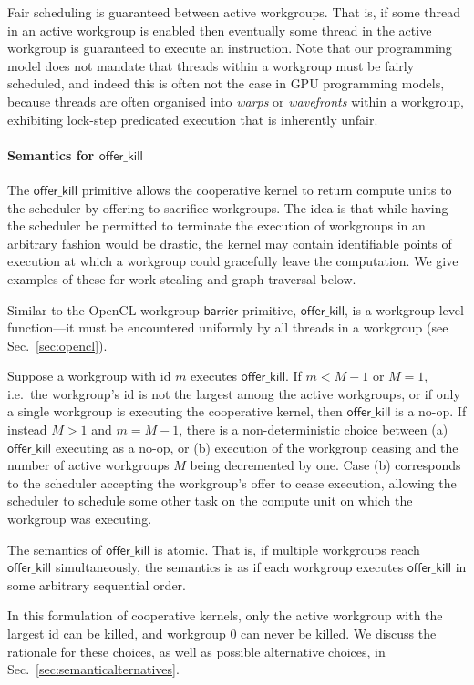 \documentclass[numbers,nocopyrightspace,10pt]{sigplanconf}
\newcommand{\mysec}{Sec.~}
\newcommand{\offerkill}{\mathsf{offer\_kill}}
\begin{document}
Fair scheduling is guaranteed between active workgroups.  That is, if
some thread in an active workgroup is enabled then eventually some
thread in the active workgroup is guaranteed to execute an
instruction.  Note that our programming model does not mandate that
threads within a workgroup must be fairly scheduled, and indeed this
is often not the case in GPU programming models, because threads are
often organised into \emph{warps} or \emph{wavefronts} within a
workgroup, exhibiting lock-step predicated execution that is
inherently unfair.

\paragraph{Semantics for $\offerkill$}

The $\offerkill$ primitive allows the cooperative kernel to return
compute units to the scheduler by offering to sacrifice workgroups.
The idea is that while having the scheduler be permitted to terminate
the execution of workgroups in an arbitrary fashion would be drastic,
the kernel may contain identifiable points of execution at which a
workgroup could gracefully leave the computation.  We give examples of
these for work stealing and graph traversal below.

Similar to the OpenCL workgroup $\mathsf{barrier}$ primitive,
$\offerkill$, is a workgroup-level function---it must be encountered
uniformly by all threads in a workgroup (see
\mysec\ref{sec:opencl}).

Suppose a workgroup with id $m$ executes $\offerkill$.  If $m < M-1$
or $M=1$, i.e.\ the workgroup's id is not the largest among the active
workgroups, or if only a single workgroup is executing the cooperative
kernel, then $\offerkill$ is a no-op.  If instead $M > 1$ and $m =
M-1$, there is a non-deterministic choice between (a) $\offerkill$
executing as a no-op, or (b) execution of the workgroup ceasing and
the number of active workgroups $M$ being decremented by one.  Case
(b) corresponds to the scheduler accepting the workgroup's offer to
cease execution, allowing the scheduler to schedule some other task on
the compute unit on which the workgroup was executing.

The semantics of $\offerkill$ is atomic.  That is, if multiple
workgroups reach $\offerkill$ simultaneously, the semantics is as if
each workgroup executes $\offerkill$ in some arbitrary sequential
order.

In this formulation of cooperative kernels, only the active workgroup
with the largest id can be killed, and workgroup 0 can never be
killed.  We discuss the rationale for these choices, as well as
possible alternative choices, in
\mysec\ref{sec:semanticalternatives}.
\end{document}
